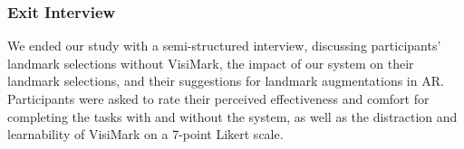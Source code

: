 

\subsubsection{Exit Interview}
We ended our study with a semi-structured interview, discussing participants’ landmark selections without VisiMark, the impact of our system on their landmark selections, and their suggestions for landmark augmentations in AR. Participants were asked to rate their perceived effectiveness and comfort for completing the tasks with and without the system, as well as the distraction and learnability of VisiMark on a 7-point Likert scale. %


